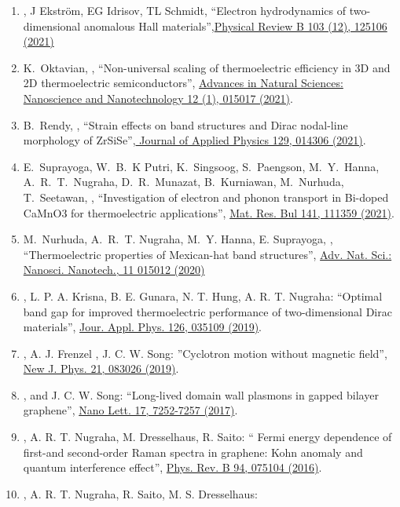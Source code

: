 \begin{enumerate}
  \item \hes, J Ekström, EG Idrisov, TL Schmidt, ``Electron hydrodynamics of two-dimensional anomalous Hall materials'',\href{https://doi.org/10.1103/PhysRevB.103.125106}{Physical Review B 103 (12), 125106 (2021)}
  \item K.~Oktavian, \hes, ``Non-universal scaling of thermoelectric efficiency in 3D and 2D thermoelectric semiconductors'', \href{https://iopscience.iop.org/article/10.1088/2043-6262/abe93c/meta}{Advances in Natural Sciences: Nanoscience and Nanotechnology 12 (1), 015017 (2021)}.
\item B.~Rendy, \hes, ``Strain effects on band structures and Dirac nodal-line morphology of ZrSiSe'',\href{https://pubs.aip.org/aip/jap/article/129/1/014306/1065328}{ Journal of Applied Physics 129, 014306 (2021)}.
\item E.~Suprayoga, W.~B.~K Putri, K.~Singsoog, S.~Paengson, M.~Y.~Hanna, A.~R.~T.~Nugraha, D.~R.~Munazat, B.~Kurniawan, M.~Nurhuda, T.~Seetawan, \hes, ``Investigation of electron and phonon transport in Bi-doped CaMnO3 for thermoelectric applications'',  \href{https://doi.org/10.1016/j.materresbull.2021.111359}{Mat. Res. Bul 141, 111359 (2021)}.
\item M.~Nurhuda, A.~R.~T. Nugraha, M.~Y. Hanna, E. Suprayoga, \hes, ``Thermoelectric properties of Mexican-hat band structures'', \href{https://doi.org/10.1088/2043-6254/ab7225}{Adv. Nat. Sci.: Nanosci. Nanotech., 11  015012 (2020)}
\item \hes, L. P. A. Krisna, B. E. Gunara, N. T. Hung, A. R. T. Nugraha: ``Optimal band gap for improved thermoelectric performance of two-dimensional Dirac materials'', \href{https://doi.org/10.1063/1.5100985}{Jour. Appl. Phys. 126, 035109 (2019)}.
\item \hes, A. J. Frenzel , J. C. W. Song: ''Cyclotron motion without magnetic field'',  \href{https://doi.org/10.1088/1367-2630/ab351c} {New J. Phys. 21, 083026 (2019)}.
  \item \hes,  and J. C. W. Song: ``Long-lived domain wall plasmons in gapped bilayer graphene'', \href{http://dx.doi.org/10.1021/acs.nanolett.7b02584}{Nano Lett. 17, 7252-7257 (2017)}.
\item \hes, A. R. T. Nugraha, M. Dresselhaus, R. Saito: `` Fermi
  energy dependence of first-and second-order Raman spectra in
  graphene: Kohn anomaly and quantum interference effect'',
  \href{http://dx.doi.org/10.1103/PhysRevB.94.075104}{ Phys. Rev. B 94, 075104 (2016)}.
 \item \hes, A. R. T. Nugraha, R. Saito, M. S. Dresselhaus:

\end{enumerate}
